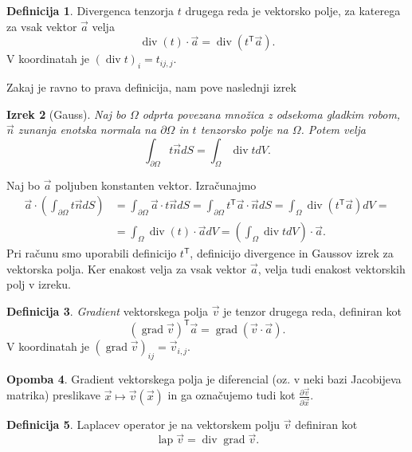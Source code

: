 \documentclass[12pt,a4paper]{article}
\theoremstyle{definition} %
\newtheorem{definicija}{Definicija}[section]
\newtheorem{opomba}[definicija]{Opomba}
\theoremstyle{plain} %
\newtheorem{izrek}[definicija]{Izrek}
\numberwithin{equation}{section}
\newcommand{\T}{\mathsf{T}}
\newcommand{\lap}{\operatorname{lap}}
\renewcommand{\div}{\operatorname{div}}
\newcommand{\grad}{\operatorname{grad}}
\newcommand{\dpar}[2]{\ensuremath{\frac{\partial #1}{\partial #2}}}
\newcommand{\vv}{\vec{v}}
\newcommand{\va}{\vec{a}}
\newcommand{\vn}{\vec{n}}
\newcommand{\vx}{\vec{x}}
\begin{document}
\begin{definicija}
  Divergenca tenzorja $t$ drugega reda je vektorsko polje, za katerega za vsak
  vektor $\va$ velja
  \[ \div(t)\cdot \va = \div(t^\T \va). \]
  V koordinatah je $(\div t)_i = t_{ij,j}$.
\end{definicija}

Zakaj je ravno to prava definicija, nam pove naslednji izrek
\begin{izrek}[Gauss]
  \label{izr:gauss}
  Naj bo $\Omega$ odprta povezana množica z odsekoma gladkim robom, $\vn$ zunanja enotska
  normala na $\partial \Omega$ in $t$ tenzorsko polje na $\Omega$.  Potem velja
  \[
    \int_{\partial \Omega} t\vn dS = \int_{\Omega} \div t dV.
  \]
\end{izrek}
\proof
Naj bo $\va$ poljuben konstanten vektor. Izračunajmo
\begin{align*}
  \va \cdot \left( \int_{\partial \Omega} t\vn dS \right) &=
  \int_{\partial \Omega}\va \cdot t\vn dS =
  \int_{\partial \Omega}t^\T \va \cdot \vn dS =
  \int_{\Omega}\div(t^\T \va) dV = \\ &=
  \int_{\Omega}\div(t) \cdot \va dV =
  \left(\int_{\Omega}\div t dV\right) \cdot \va.
\end{align*}
Pri računu smo uporabili definicijo $t^\T$, definicijo divergence in Gaussov
izrek za vektorska polja. Ker enakost velja za vsak vektor $\va$, velja tudi
enakost vektorskih polj v izreku.
\endproof

\begin{definicija}
  \emph{Gradient} vektorskega polja $\vv$ je tenzor drugega reda, definiran kot
  \[
    (\grad\vv)^\T \va = \grad(\vv\cdot\va).
  \]
  V koordinatah je $(\grad\vv)_{ij} = \vv_{i,j}$.
\end{definicija}
\begin{opomba}
  Gradient vektorskega polja je diferencial (oz. v neki bazi Jacobijeva matrika)
  preslikave $\vx \mapsto \vv(\vx)$ in ga označujemo tudi kot $\dpar{\vv}{\vx}$.
\end{opomba}

\begin{definicija}
  Laplacev operator je na vektorskem polju $\vv$ definiran kot
  \[ \lap \vv = \div\grad \vv.  \]
\end{definicija}
\end{document}

